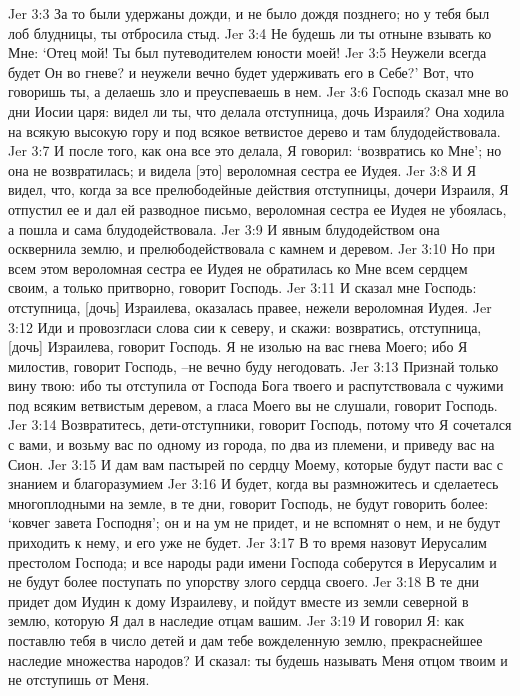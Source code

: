 Jer 3:3  За то были удержаны дожди, и не было дождя позднего; но у тебя был лоб блудницы, ты отбросила стыд.
Jer 3:4  Не будешь ли ты отныне взывать ко Мне: `Отец мой! Ты был путеводителем юности моей!
Jer 3:5  Неужели всегда будет Он во гневе? и неужели вечно будет удерживать его в Себе?' Вот, что говоришь ты, а делаешь зло и преуспеваешь в нем.
Jer 3:6  Господь сказал мне во дни Иосии царя: видел ли ты, что делала отступница, дочь Израиля? Она ходила на всякую высокую гору и под всякое ветвистое дерево и там блудодействовала.
Jer 3:7  И после того, как она все это делала, Я говорил: `возвратись ко Мне'; но она не возвратилась; и видела [это] вероломная сестра ее Иудея.
Jer 3:8  И Я видел, что, когда за все прелюбодейные действия отступницы, дочери Израиля, Я отпустил ее и дал ей разводное письмо, вероломная сестра ее Иудея не убоялась, а пошла и сама блудодействовала.
Jer 3:9  И явным блудодейством она осквернила землю, и прелюбодействовала с камнем и деревом.
Jer 3:10  Но при всем этом вероломная сестра ее Иудея не обратилась ко Мне всем сердцем своим, а только притворно, говорит Господь.
Jer 3:11  И сказал мне Господь: отступница, [дочь] Израилева, оказалась правее, нежели вероломная Иудея.
Jer 3:12  Иди и провозгласи слова сии к северу, и скажи: возвратись, отступница, [дочь] Израилева, говорит Господь. Я не изолью на вас гнева Моего; ибо Я милостив, говорит Господь, --не вечно буду негодовать.
Jer 3:13  Признай только вину твою: ибо ты отступила от Господа Бога твоего и распутствовала с чужими под всяким ветвистым деревом, а гласа Моего вы не слушали, говорит Господь.
Jer 3:14  Возвратитесь, дети-отступники, говорит Господь, потому что Я сочетался с вами, и возьму вас по одному из города, по два из племени, и приведу вас на Сион.
Jer 3:15  И дам вам пастырей по сердцу Моему, которые будут пасти вас с знанием и благоразумием
Jer 3:16  И будет, когда вы размножитесь и сделаетесь многоплодными на земле, в те дни, говорит Господь, не будут говорить более: `ковчег завета Господня'; он и на ум не придет, и не вспомнят о нем, и не будут приходить к нему, и его уже не будет.
Jer 3:17  В то время назовут Иерусалим престолом Господа; и все народы ради имени Господа соберутся в Иерусалим и не будут более поступать по упорству злого сердца своего.
Jer 3:18  В те дни придет дом Иудин к дому Израилеву, и пойдут вместе из земли северной в землю, которую Я дал в наследие отцам вашим.
Jer 3:19  И говорил Я: как поставлю тебя в число детей и дам тебе вожделенную землю, прекраснейшее наследие множества народов? И сказал: ты будешь называть Меня отцом твоим и не отступишь от Меня.
